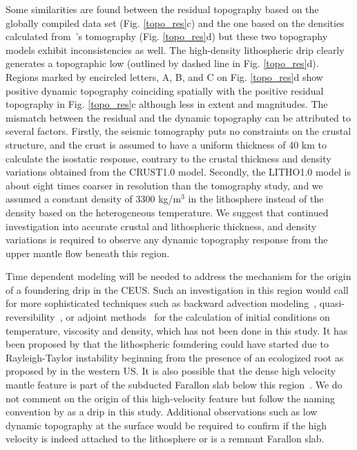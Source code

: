 \documentclass[draft,linenumbers]{agujournal2018}
\begin{document}
Some similarities are found between the residual topography based on the globally compiled data set (Fig. \ref{topo_res}c) and the one based on the densities calculated from~\citet{Biryol_2016}'s tomography (Fig. \ref{topo_res}d) but these two topography models exhibit inconsistencies as well. The high-density lithospheric drip clearly generates a topographic low (outlined by dashed line in Fig. \ref{topo_res}d). 
Regions marked by encircled letters, A, B, and C on Fig. \ref{topo_res}d show positive dynamic topography coinciding spatially with the positive residual topography in Fig. \ref{topo_res}c although less in extent and magnitudes. The mismatch between the residual and the dynamic topography can be attributed to several factors. Firstly, the seismic tomography puts no constraints on the crustal structure, and the crust is assumed to have a uniform thickness of 40 km to calculate the isostatic response, contrary to the crustal thickness and density variations obtained from the CRUST1.0 model. Secondly, the LITHO1.0 model is about eight times coarser in resolution than the tomography study, and we assumed a constant density of 3300 kg/m$^3$ in the lithosphere instead of the density based on the heterogeneous temperature. We suggest that continued investigation into accurate crustal and lithospheric thickness, and density variations is required to observe any dynamic topography response from the upper mantle flow beneath this region.
%
    
Time dependent modeling will be needed to address the mechanism for the origin of a foundering drip in the CEUS. Such an investigation in this region would call for more sophisticated techniques such as backward advection modeling~\citep[e.g.,][]{conrad2003seismic}, quasi-reversibility~\citep{glivsovic2016new}, or adjoint methods~\citep[e.g.,][]{bunge2003mantle, liu2008reconstructing} for the calculation of initial conditions on temperature, viscosity and density, which has not been done in this study. It has been proposed by \cite{Biryol_2016} that the lithospheric foundering could have started due to Rayleigh-Taylor instability beginning from the presence of an ecologized root as proposed by \citet{le2006mantle} in the western US. It is also possible that the dense high velocity mantle feature is part of the subducted Farallon slab below this region~\citep{schmandt2010seismic}. We do not comment on the origin of this high-velocity feature but follow the naming convention by \citet{Biryol_2016} as a drip in this study. Additional observations such as low dynamic topography at the surface would be required to confirm if the high velocity is indeed attached to the lithosphere or is a remnant Farallon slab.
  
\end{document}
